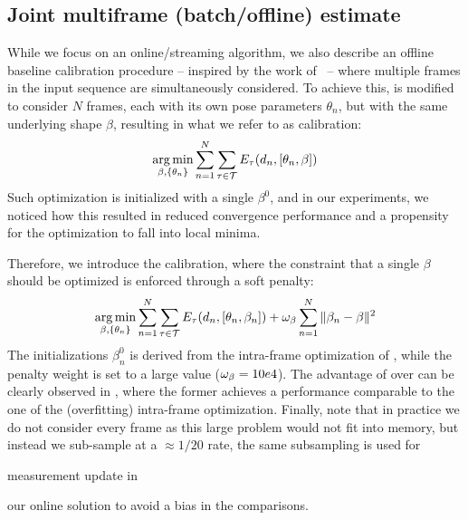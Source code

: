 

\subsection{Joint multiframe (batch/offline) estimate}
\label{sec:batch}
\label{sec:offline}
While we focus on an online/streaming algorithm, we also describe an offline baseline calibration procedure -- inspired by the work of~\cite{taylor2014user} -- where multiple frames in the input sequence are simultaneously considered. To achieve this,  is modified to consider $N$ frames, each with its own pose parameters $\theta_n$, but with the same underlying shape $\beta$, resulting in what we refer to as \emph{\OfflineHard{}} calibration:
% 
\begin{equation}
\operatorname*{arg\,min}_{\beta, \{\theta_n\} } \sum_{n=1}^N \sum_{\tau \in \mathcal{T}} E_{\tau}(d_n, [\theta_n, \beta]) 
\label{eq:offlinehard}
\end{equation}
% 
Such optimization is initialized with a single $\beta^0$, and in our experiments, we noticed how this resulted in reduced convergence performance and a propensity for the optimization to fall into local minima. 

Therefore, we introduce the \emph{\OfflineSoft{}} calibration, where the constraint that a single $\beta$ should be optimized is enforced through a soft penalty:
% 
\begin{equation}
\operatorname*{arg\,min}_{\beta, \{\theta_n\} } \sum_{n=1}^N \sum_{\tau \in \mathcal{T}} E_{\tau}(d_n, [\theta_n, \beta_n]) + \omega_{\beta} \sum_{n=1}^N \| \beta_n - \beta \|^2
\label{eq:offlinesoft}
\end{equation}
%
The initializations $\beta_n^0$ is derived from the intra-frame optimization of , while the penalty weight is set to a large value ($\small \omega_{\beta}=10e4$). The advantage of \OfflineSoft{} over \OfflineHard{} can be clearly observed in , where the former achieves a performance comparable to the one of the (overfitting) intra-frame optimization. Finally, note that in practice we do not consider every frame as this large problem would not fit into memory, but instead we sub-sample at a $\approx 1/20$ rate, the same subsampling is used for \begin{edit} measurement update in \end{edit}our online solution to avoid a bias in the comparisons. 

